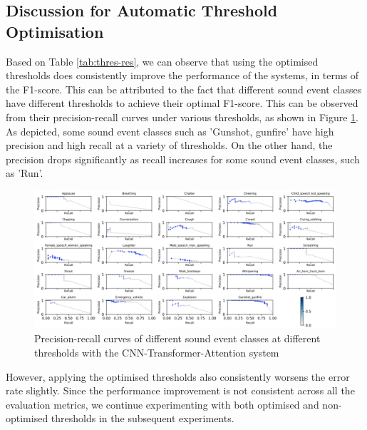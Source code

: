 \subsection{Discussion for Automatic Threshold Optimisation}
Based on Table \ref{tab:thres-res}, we can observe that using the optimised thresholds does consistently improve the performance of the systems, in terms of the F1-score. 
This can be attributed to the fact that different sound event classes have different thresholds to achieve their optimal F1-score. This can be observed from their precision-recall curves under various thresholds, as shown in Figure \ref{fig:precision-recall-curves}. As depicted, some sound event classes such as 'Gunshot, gunfire' have high precision and high recall at a variety of thresholds. On the other hand, the precision drops significantly as recall increases for some sound event classes, such as 'Run'.\\

\begin{figure}[!htb]
    \centering
    \includegraphics[width=\textwidth]{fig/precision-recall-curves.png}
    \caption{Precision-recall curves of different sound event classes at different thresholds with the CNN-Transformer-Attention system}
    \label{fig:precision-recall-curves}
\end{figure}

However, applying the optimised thresholds also consistently worsens the error rate slightly. Since the performance improvement is not consistent across all the evaluation metrics, we continue experimenting with both optimised and non-optimised thresholds in the subsequent experiments.


